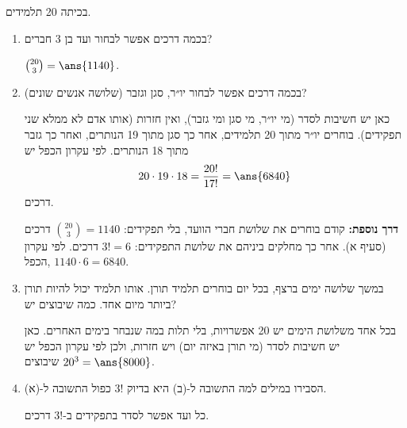 בכיתה 20 תלמידים.
\begin{enumerate}
\item בכמה דרכים אפשר לבחור ועד בן 3 חברים?
\begin{solbox}
$\binom{20}3=\ans{1140}$.
\end{solbox}
\item בכמה דרכים אפשר לבחור יו״ר, סגן וגזבר (שלושה אנשים שונים)?
\begin{solbox}
כאן יש חשיבות לסדר (מי יו״ר, מי סגן ומי גזבר), ואין חזרות (אותו אדם לא ממלא שני תפקידים). בוחרים יו״ר מתוך 20 תלמידים, אחר כך סגן מתוך 19 הנותרים, ואחר כך גזבר מתוך 18 הנותרים. לפי עקרון הכפל יש
\[
20\cdot19\cdot18=\frac{20!}{17!}=\ans{6840}
\]
דרכים.

\textbf{דרך נוספת:} קודם בוחרים את שלושת חברי הוועד, בלי תפקידים: $\binom{20}3=1140$ דרכים (סעיף א). אחר כך מחלקים ביניהם את שלושת התפקידים: $3!=6$ דרכים. לפי עקרון הכפל, $1140\cdot6=6840$.
\end{solbox}
\item במשך שלושה ימים ברצף, בכל יום בוחרים תלמיד תורן. אותו תלמיד יכול להיות תורן ביותר מיום אחד. כמה שיבוצים יש?
\begin{solbox}
בכל אחד משלושת הימים יש 20 אפשרויות, בלי תלות במה שנבחר בימים האחרים. כאן יש חשיבות לסדר (מי תורן באיזה יום) ויש חזרות, ולכן לפי עקרון הכפל יש $20^3=\ans{8000}$ שיבוצים.
\end{solbox}
\item הסבירו במילים למה התשובה ל-(ב) היא בדיוק $3!$ כפול התשובה ל-(א).
\begin{solbox}
כל ועד אפשר לסדר בתפקידים ב-$3!$ דרכים.
\end{solbox}
\end{enumerate}
